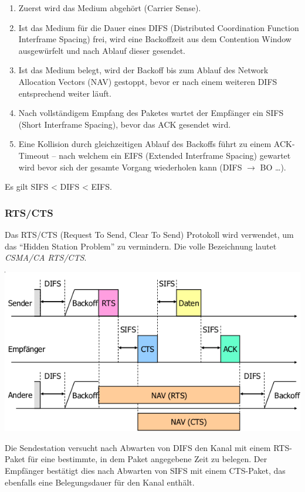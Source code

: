 \begin{enumerate}
	\item Zuerst wird das Medium abgehört (Carrier Sense).
	\item Ist das Medium für die Dauer eines DIFS (Distributed Coordination
		Function Interframe Spacing) frei, wird eine Backoffzeit aus dem Contention
		Window ausgewürfelt und nach Ablauf dieser gesendet.
	\item Ist das Medium belegt, wird der Backoff bis zum Ablauf des Network
		Allocation Vectors (NAV) gestoppt, bevor er nach einem weiteren DIFS
		entsprechend weiter läuft.
	\item Nach vollständigem Empfang des Paketes wartet der Empfänger ein SIFS
		(Short Interframe Spacing), bevor das ACK gesendet wird.
	\item Eine Kollision durch gleichzeitigen Ablauf des Backoffs führt zu einem
		ACK-Timeout -- nach welchem ein EIFS (Extended Interframe Spacing) gewartet
		wird bevor sich der gesamte Vorgang wiederholen kann (DIFS $\rightarrow$ BO
		\ldots).
\end{enumerate}

Es gilt SIFS < DIFS < EIFS.


\subsubsection{RTS/CTS}

Das RTS/CTS (Request To Send, Clear To Send) Protokoll wird verwendet, um das
``Hidden Station Problem'' zu vermindern. Die volle Bezeichnung lautet
\textit{CSMA/CA RTS/CTS}.

\begin{center}
	\includegraphics[width=.8\textwidth]{media/rts_cts.png}
\end{center}

Die Sendestation versucht nach Abwarten von DIFS den Kanal mit einem RTS-Paket
für eine bestimmte, in dem Paket angegebene Zeit zu belegen. Der Empfänger
bestätigt dies nach Abwarten von SIFS mit einem CTS-Paket, das ebenfalls eine
Belegungsdauer für den Kanal enthält.


